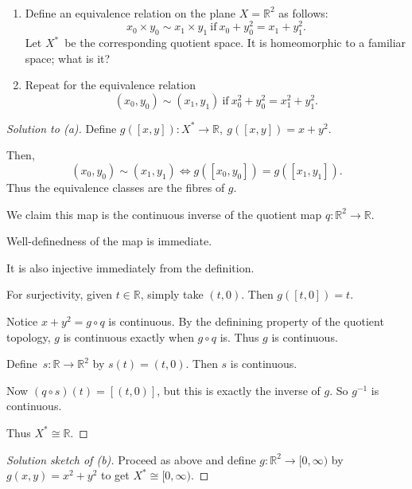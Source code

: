 \documentclass[11pt]{article}
\begin{document}
\begin{prob}
    \medskip 
    \ 
    \begin{enumerate}[label=\alph*)]
        \item Define an equivalence relation on the plane 
            $X = \mathbb R^2$ as follows: 
            \[
                x_0 \times y_0 \sim x_1 \times y_1 \ \text{if} \ 
                x_0 + y_0^2 = x_1 + y_1^2. 
            \]
            Let $X^*$ be the corresponding quotient space. It is homeomorphic 
            to a familiar space; what is it? 
        \item Repeat for the equivalence relation 
            \[
                (x_0, y_0) \sim (x_1,y_1) \ \text{if} \ 
                x_0^2 + y_0^2 = x_1^2 + y_1^2. 
            \]
    \end{enumerate}
\end{prob}
\begin{proof}[Solution to (a)]
    Define $g([x,y]): X^* \to \mathbb R, \ g([x,y]) = x+y^2$. 

    Then, 
    \[
        (x_0,y_0) \sim (x_1,y_1) 
        \Leftrightarrow 
        g([x_0,y_0]) = g([x_1,y_1]). 
    \]
    Thus the equivalence classes are 
    the fibres of $g$.
    
    We claim this map is the continuous 
    inverse of the quotient map 
    $q : \mathbb R^2 \to \mathbb R$. 

    Well-definedness of the map is 
    immediate. 

    It is also injective immediately from the definition. 

    For surjectivity, given $t \in \mathbb R$, simply take 
    $(t,0)$. Then $g([t,0]) = t$. 

    Notice $x + y^2 = g \circ q$ is continuous. 
    By the definining property of the quotient topology, 
    $g$ is continuous exactly when $g \circ q$ is. 
    Thus $g$ is continuous. 

    Define $s : \mathbb R \to \mathbb R^2$ 
    by $s(t) = (t,0)$. Then $s$ is continuous. 

    Now $(q \circ s) (t) = [(t,0)]$, but this is 
    exactly the inverse of $g$.
    So $g^{-1}$ is continuous. 

    Thus $X^* \cong \mathbb R$. 
\end{proof}
\begin{proof}[Solution sketch of (b)]
    Proceed as above and define 
    $g : \mathbb R^2 \to [0,\infty)$ by 
    $g(x,y) = x^2 + y^2$ to 
    get $X^* \cong [0,\infty)$.
\end{proof}
\end{document}
